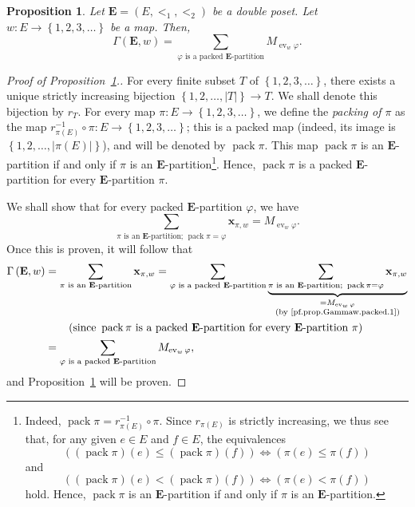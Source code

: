 \documentclass[12pt]{article}
\theoremstyle{plain}
\newtheorem{proposition}[theorem]{Proposition}
\theoremstyle{definition}
\theoremstyle{remark}
\let\sumnonlimits\sum
\renewcommand{\sum}{\sumnonlimits\limits}
\newcommand{\xx}{{\mathbf{x}}}
\newcommand{\ev}{\operatorname{ev}}
\newcommand{\pack}{\operatorname{pack}}
\newcommand{\EE}{{\mathbf{E}}}
\begin{document}
\begin{proposition}
\label{prop.Gammaw.packed}
Let $\EE = \left(E, <_1, <_2\right)$ be a double poset. Let
$w : E \to \left\{1, 2, 3, \ldots\right\}$ be a map.
Then,
\begin{equation}
\label{eq.prop.Gammaw.packed}
\Gamma\left(\EE , w\right)
= \sum_{\varphi \text{ is a packed } \EE\text{-partition}}
M_{\ev_w \varphi} .
\end{equation}
\end{proposition}

\begin{proof}[Proof of Proposition~\ref{prop.Gammaw.packed}.]
For every finite subset $T$ of
$\left\{1, 2, 3, \ldots\right\}$, there exists a unique strictly
increasing bijection $\left\{1, 2, \ldots,
\left|T\right|\right\} \to T$. We shall denote this bijection by
$r_T$.
For every map $\pi : E \to \left\{1, 2, 3, \ldots\right\}$, we
define the \textit{packing of $\pi$} as the map
$r_{\pi\left(E\right)}^{-1} \circ \pi : E \to
\left\{1, 2, 3, \ldots\right\}$; this is a packed map (indeed,
its image is
$\left\{1, 2, \ldots, \left|\pi\left(E\right)\right|\right\}$),
and will be
denoted by $\pack \pi$. This map $\pack \pi$ is an $\EE$-partition
if and only if $\pi$ is an $\EE$-partition\footnote{Indeed,
$\pack \pi = r_{\pi\left(E\right)}^{-1} \circ \pi$. Since
$r_{\pi\left(E\right)}$ is strictly increasing, we thus see that,
for any given $e \in E$ and $f \in E$, the equivalences
\[
\left(\left(\pack \pi\right)\left(e\right)
      \leq \left(\pack \pi\right)\left(f\right)\right)
\Longleftrightarrow
\left( \pi\left(e\right) \leq \pi\left(f\right) \right)
\]
and
\[
\left(\left(\pack \pi\right)\left(e\right)
      < \left(\pack \pi\right)\left(f\right)\right)
\Longleftrightarrow
\left( \pi\left(e\right) < \pi\left(f\right) \right)
\]
hold. Hence, $\pack \pi$ is an $\EE$-partition
if and only if $\pi$ is an $\EE$-partition.}.
Hence, $\pack \pi$ is a packed $\EE$-partition for every
$\EE$-partition $\pi$.

We shall show that for every packed $\EE$-partition $\varphi$, we
have
\begin{equation}
\sum_{\pi\text{ is an }\EE\text{-partition; } \pack \pi = \varphi}
\xx_{\pi, w} = M_{\ev_w \varphi} .
\label{pf.prop.Gammaw.packed.1}
\end{equation}
Once this is proven, it will follow that
\begin{align*}
\Gamma\left(\EE , w\right)
&= \sum_{\pi\text{ is an }\EE\text{-partition}}
  \xx_{\pi, w}
= \sum_{\varphi \text{ is a packed } \EE\text{-partition}}
  \underbrace{\sum_{\pi\text{ is an }\EE\text{-partition; } \pack \pi = \varphi}
              \xx_{\pi, w}}_{\substack{ = M_{\ev_w \varphi} \\
                             \text{(by \eqref{pf.prop.Gammaw.packed.1})}
                             }} \\
& \qquad \left(\text{since } \pack \pi \text{ is a packed }
             \EE\text{-partition for every }
             \EE\text{-partition } \pi\right) \\
&= \sum_{\varphi \text{ is a packed } \EE\text{-partition}}
M_{\ev_w \varphi} ,
\end{align*}
and Proposition~\ref{prop.Gammaw.packed} will be proven.


\end{proof}
\end{document}
